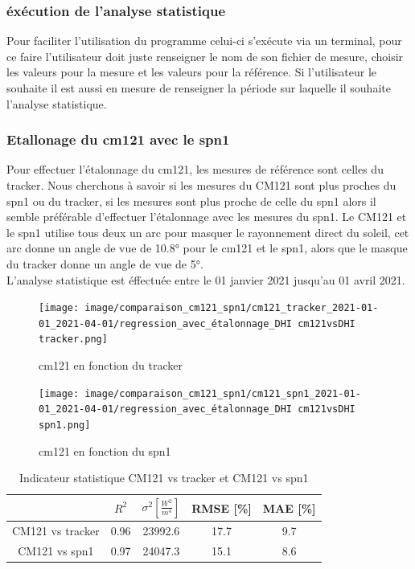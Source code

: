 \documentclass[12pt,a4paper]{article}
\begin{document}
\begin{flushleft}
\subsubsection{éxécution de l'analyse statistique}

Pour faciliter l'utilisation du programme celui-ci s'exécute via un terminal, pour ce faire l'utilisateur doit juste renseigner le nom de son fichier de mesure, choisir les valeurs pour la mesure et les valeurs pour la référence. Si l'utilisateur le souhaite il est aussi en mesure de renseigner la période sur laquelle il souhaite l'analyse statistique.


\subsubsection{Etallonage du cm121 avec le spn1}

Pour effectuer l'étalonnage du cm121, les mesures de référence sont celles du tracker. Nous cherchons à savoir si les mesures du CM121 sont plus proches du spn1 ou du tracker, si les mesures sont plus proche de celle du spn1 alors il semble préférable d'effectuer l'étalonnage avec les mesures du spn1. Le CM121 et le spn1 utilise tous deux un arc pour masquer le rayonnement direct du soleil, cet arc donne un angle de vue de 10.8° pour le cm121 et le spn1, alors que le masque du tracker donne un angle de vue de 5°.\\
L'analyse statistique est éffectuée entre le 01 janvier 2021 jusqu'au 01 avril 2021.

\begin{figure}[H]
\centering
\texttt{[image: image/comparaison\_cm121\_spn1/cm121\_tracker\_2021-01-01\_2021-04-01/regression\_avec\_étalonnage\_DHI cm121vsDHI tracker.png]} 
\caption{cm121 en fonction du tracker}  
\end{figure}

\begin{figure}[H]
\centering
\texttt{[image: image/comparaison\_cm121\_spn1/cm121\_spn1\_2021-01-01\_2021-04-01/regression\_avec\_étalonnage\_DHI cm121vsDHI spn1.png]}  
\caption{cm121 en fonction du spn1}  
\end{figure}

\begin{table}[H]
\begin{center}
\begin{tabular}{ |c|c|c|c|c| } 
 \hline
  & $R^2$ & $\sigma ^2 [\frac{W^2}{m^4}]$ & RMSE [\%] & MAE [\%] \\ 
  \hline
 CM121 vs tracker & 0.96 & 23992.6 & 17.7 & 9.7\\ 
 \hline
 CM121 vs spn1 & 0.97 & 24047.3 & 15.1 & 8.6 \\ 
 \hline
\end{tabular}
\caption{Indicateur statistique CM121 vs tracker et CM121 vs spn1}
\end{center}
\end{table}



\end{flushleft}
\end{document}
